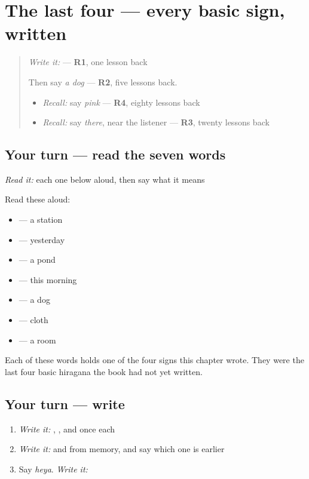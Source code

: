 \section[(dialogue)]{The last four — every basic sign, written}

\label{lesson:JA-R133-last-four}



\begin{quote}
\emph{Write it:} \textbf{} — \textbf{R1}, one lesson back

Then say \emph{a dog} — \textbf{R2}, five lessons back.

\begin{itemize}
\raggedright
  \item \emph{Recall:} say \emph{pink} — \textbf{R4}, eighty lessons back
  \item \emph{Recall:} say \emph{there}, near the listener — \textbf{R3}, twenty lessons back
\end{itemize}
\end{quote}

\subsection*{Your turn — read the seven words}
\emph{Read it:} each one below aloud, then say what it means

Read these aloud:

\begin{itemize}
\raggedright
  \item \textbf{} — a station
  \item \textbf{} — yesterday
  \item \textbf{} — a pond
  \item \textbf{} — this morning
  \item \textbf{} — a dog
  \item \textbf{} — cloth
  \item \textbf{} — a room
\end{itemize}

Each of these words holds one of the four signs this chapter wrote. They were the last four basic hiragana the book had not yet written.

\subsection*{Your turn — write}
\begin{enumerate}
\raggedright
  \item \emph{Write it:} \textbf{}, \textbf{}, \textbf{} and \textbf{} once each
  \item \emph{Write it:} \textbf{} and \textbf{} from memory, and say which one is earlier
  \item Say \emph{heya}. \emph{Write it:} \textbf{}
\end{enumerate}

